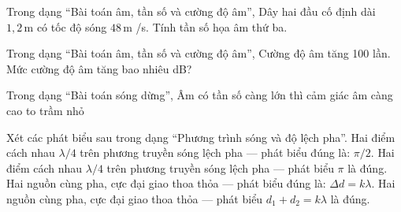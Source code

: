 \begin{bt}
Trong dạng “Bài toán âm, tần số và cường độ âm”, Dây hai đầu cố định dài $1,2\,\text{m}$ có tốc độ sóng $48\,\text{m}$ /s. Tính tần số họa âm thứ ba.
\end{bt}

\begin{ex}
Trong dạng “Bài toán âm, tần số và cường độ âm”, Cường độ âm tăng 100 lần. Mức cường độ âm tăng bao nhiêu dB?
\end{ex}

\begin{ex}
Trong dạng “Bài toán sóng dừng”, Âm có tần số càng lớn thì cảm giác âm càng
\choice
{\True cao}
{to}
{trầm}
{nhỏ}
\end{ex}

\begin{ex}
Xét các phát biểu sau trong dạng “Phương trình sóng và độ lệch pha”.
\choiceTF
{\True Hai điểm cách nhau $\lambda/4$ trên phương truyền sóng lệch pha — phát biểu đúng là: $\pi/2$.}
{Hai điểm cách nhau $\lambda/4$ trên phương truyền sóng lệch pha — phát biểu $\pi$ là đúng.}
{\True Hai nguồn cùng pha, cực đại giao thoa thỏa — phát biểu đúng là: $\Delta d=k\lambda$.}
{Hai nguồn cùng pha, cực đại giao thoa thỏa — phát biểu $d_1+d_2=k\lambda$ là đúng.}
\end{ex}

